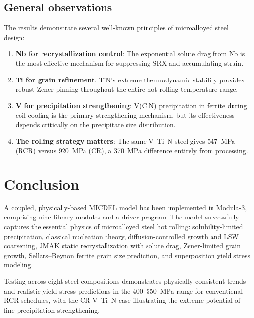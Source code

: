 \documentclass[11pt,a4paper]{article}
\begin{document}
\subsection{General observations}

The results demonstrate several well-known principles of microalloyed steel
design:
\begin{enumerate}
  \item \textbf{Nb for recrystallization control}: The exponential solute drag
    from Nb is the most effective mechanism for suppressing SRX and accumulating
    strain.
  \item \textbf{Ti for grain refinement}: TiN's extreme thermodynamic stability
    provides robust Zener pinning throughout the entire hot rolling temperature
    range.
  \item \textbf{V for precipitation strengthening}: V(C,N) precipitation in
    ferrite during coil cooling is the primary strengthening mechanism, but its
    effectiveness depends critically on the precipitate size distribution.
  \item \textbf{The rolling strategy matters}: The same V--Ti--N steel gives
    \SI{547}{\mega\pascal} (RCR) versus \SI{920}{\mega\pascal} (CR), a
    \SI{370}{\mega\pascal} difference entirely from processing.
\end{enumerate}

\section{Conclusion}

A coupled, physically-based MICDEL model has been implemented in Modula-3,
comprising nine library modules and a driver program.  The model successfully
captures the essential physics of microalloyed steel hot rolling:
solubility-limited precipitation, classical nucleation theory,
diffusion-controlled growth and LSW coarsening, JMAK static recrystallization
with solute drag, Zener-limited grain growth, Sellars--Beynon ferrite grain size
prediction, and superposition yield stress modeling.

Testing across eight steel compositions demonstrates physically consistent
trends and realistic yield stress predictions in the
400--\SI{550}{\mega\pascal} range for conventional RCR schedules, with
the CR V--Ti--N case illustrating the extreme potential of fine precipitation
strengthening.
\end{document}
